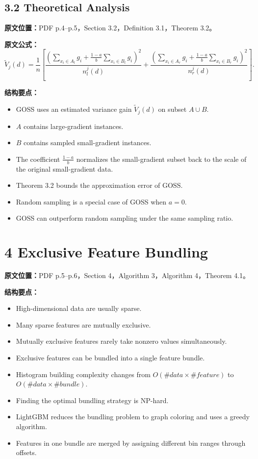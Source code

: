 \subsection{3.2 Theoretical Analysis}

\textbf{原文位置：}PDF p.4--p.5，Section 3.2，Definition 3.1，Theorem 3.2。

\textbf{原文公式：}
\[
  \tilde{V}_j(d)
  =
  \frac{1}{n}
  \left[
    \frac{
      \left(
        \sum_{x_i\in A_l}g_i
        +
        \frac{1-a}{b}\sum_{x_i\in B_l}g_i
      \right)^2
    }{n_l^j(d)}
    +
    \frac{
      \left(
        \sum_{x_i\in A_r}g_i
        +
        \frac{1-a}{b}\sum_{x_i\in B_r}g_i
      \right)^2
    }{n_r^j(d)}
  \right].
\]

\textbf{结构要点：}
\begin{itemize}
  \item GOSS uses an estimated variance gain $\tilde{V}_j(d)$ on subset $A\cup B$.
  \item $A$ contains large-gradient instances.
  \item $B$ contains sampled small-gradient instances.
  \item The coefficient $\frac{1-a}{b}$ normalizes the small-gradient subset back to the scale of the original small-gradient data.
  \item Theorem 3.2 bounds the approximation error of GOSS.
  \item Random sampling is a special case of GOSS when $a=0$.
  \item GOSS can outperform random sampling under the same sampling ratio.
\end{itemize}

\section{4 Exclusive Feature Bundling}

\textbf{原文位置：}PDF p.5--p.6，Section 4，Algorithm 3，Algorithm 4，Theorem 4.1。

\textbf{结构要点：}
\begin{itemize}
  \item High-dimensional data are usually sparse.
  \item Many sparse features are mutually exclusive.
  \item Mutually exclusive features rarely take nonzero values simultaneously.
  \item Exclusive features can be bundled into a single feature bundle.
  \item Histogram building complexity changes from $O(\#data\times \#feature)$ to $O(\#data\times \#bundle)$.
  \item Finding the optimal bundling strategy is NP-hard.
  \item LightGBM reduces the bundling problem to graph coloring and uses a greedy algorithm.
  \item Features in one bundle are merged by assigning different bin ranges through offsets.
\end{itemize}

